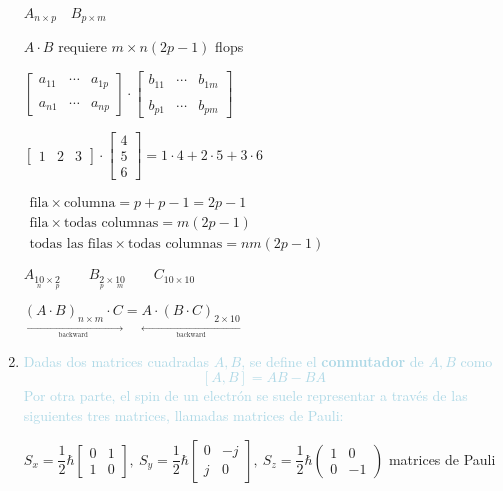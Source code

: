 \begin{enumerate}[label=\color{red}\textbf{\arabic*)}, leftmargin=*]
	$A_{n\times p}\quad B_{p\times m}$
	
	$A\cdot B$ requiere $m\times n(2p-1)$ flops
	
	$\begin{bmatrix}
		a_{11} & \cdots & a_{1p}\\
		\\
		a_{n1} & \cdots & a_{np}
	\end{bmatrix}\cdot\begin{bmatrix}
		b_{11} & \cdots & b_{1m}\\
		\\
		b_{p1} & \cdots & b_{pm}
	\end{bmatrix}$
	
	$\begin{bmatrix}
		1 & 2 & 3
	\end{bmatrix}\cdot\begin{bmatrix}
		4 \\
		5\\
		6
	\end{bmatrix}=1\cdot 4+2\cdot 5+3\cdot 6$
	
	$\begin{array}{l}
		\mathrm{fila}\times\mathrm{columna}= p+p-1=2p-1\\
		\mathrm{fila}\times\text{todas columnas}=m(2p-1)\\
		\text{todas las filas}\times\text{todas columnas}=\boxed{nm(2p-1)}
	\end{array}$
	
	$A_{\underset{n}{10}\times\underset{p}{2}}\qquad
	B_{\underset{p}{2}\times\underset{m}{10}}\qquad C_{10\times10}$
	
	$\underset{\xrightarrow[\mathrm{backward}]{\hspace{2cm}}}{(A\cdot B)_{n\times
			m}\cdot C}=\underset{\xleftarrow[\mathrm{backward}]{\hspace{2cm}}}{A\cdot(B\cdot
		C)_{2\times10}}$
	\item \textcolor{lightblue}{Dadas dos matrices cuadradas $A,B$, se define el
		\textbf{conmutador} de $A,B$ como \[ [A,B]=AB-BA \] Por otra parte, el spin de
		un electrón se suele representar a través de las siguientes tres matrices,
		llamadas matrices de Pauli: \[  \]}
	
	$S_x=\dfrac{1}{2}\hbar\begin{bmatrix}
		0 & 1 \\
		1 & 0
	\end{bmatrix},\:S_y=\dfrac{1}{2}\hbar\begin{bmatrix}
		0&-j\\
		j&0
	\end{bmatrix},\:S_z=\dfrac{1}{2}\hbar\begin{pmatrix}
		1 & 0\\
		0 & -1
	\end{pmatrix}$ matrices de Pauli
	

\end{enumerate}
